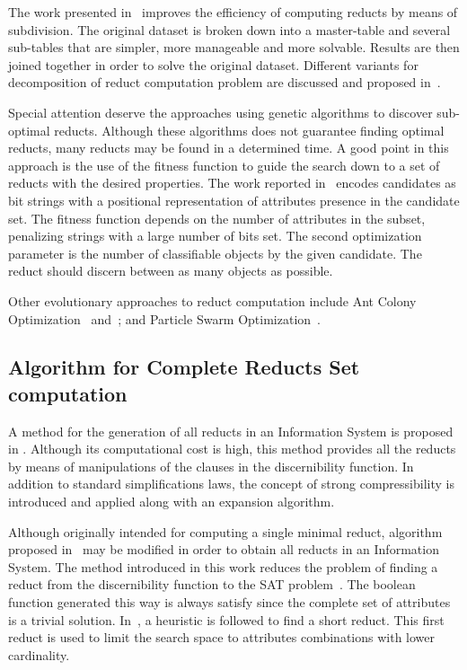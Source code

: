 \documentclass[11pt,authoryear]{elsarticle}
\begin{document}
  The work presented in~\cite{Jiao10} improves the efficiency of computing reducts by means of subdivision. The 
  original dataset is broken down into a master-table and several sub-tables that are simpler, more manageable 
  and more solvable. Results are then joined together in order to solve the original dataset. Different variants
  for decomposition of reduct computation problem are discussed and proposed in~\cite{Strakowski08}.
  
  Special attention deserve the approaches using genetic algorithms to discover sub-optimal reducts. Although 
  these algorithms does not guarantee finding optimal reducts, many reducts may be found in a determined time.
  A good point in this approach is the use of the fitness function to guide the search down to a set of 
  reducts with the desired properties. The work reported in~\cite{Wroblewski95} encodes candidates as bit 
  strings with a positional representation of attributes presence in the candidate set. The fitness function
  depends on the number of attributes in the subset, penalizing strings with a large number of bits set. The 
  second optimization parameter is the number of classifiable objects by the given candidate. The reduct should 
  discern between as many objects as possible.
  
  Other evolutionary approaches to reduct computation include Ant Colony Optimization~\cite{Jensen03}
  and~\cite{Chen10}; and Particle Swarm Optimization~\cite{Wang07}.
    
\subsection{Algorithm for Complete Reducts Set computation}
  A method for the generation of all reducts in an Information System is proposed in \cite{Starzyk99,Starzyk00}.
  Although its computational cost is high, this method provides all the reducts by means of manipulations of 
  the clauses in the discernibility function. In addition to standard simplifications laws, the concept of 
  strong compressibility is introduced and applied along with an expansion algorithm.
  
  Although originally intended for computing a single minimal reduct, algorithm proposed in~\cite{Jensen14} may be
  modified in order to obtain all reducts in an Information System. The method introduced in this work reduces
  the problem of finding a reduct from the discernibility function to the SAT problem~\cite{Davis62}. The boolean
  function generated this way is always satisfy since the complete set of attributes is a trivial solution.
  In~\cite{Lin04}, a heuristic is followed to find a short reduct. This first reduct is used to limit the search
  space to attributes combinations with lower cardinality.
  
\end{document}
